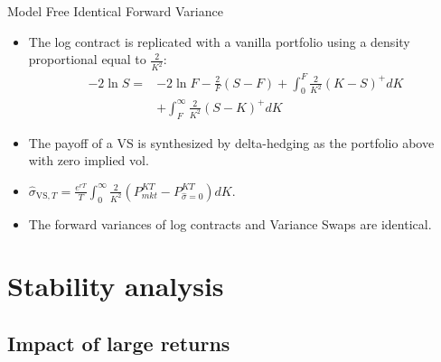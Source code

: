 \documentclass{beamer}
\begin{document}
    \begin{frame}{Model Free Identical Forward Variance}
        \begin{itemize}
            \item The log contract is replicated with a vanilla portfolio using a density proportional equal to \(\frac{2}{K^{2}}\):
            \begin{align*}
                -2 \ln S = & -2\ln F - \frac{2}{F}(S-F) + \int_{0}^{F} \frac{2}{K^{2}}(K-S)^{+}dK\\
                & + \int_{F}^{\infty} \frac{2}{K^{2}}(S-K)^{+}dK
            \end{align*}
            \item The payoff of a VS is synthesized by delta-hedging as the portfolio above with zero implied vol.
            \item $\widehat{\sigma}_{\text{VS},T} = \frac{e^{rT}}{T} \int_{0}^{\infty} \frac{2}{K^{2}}(P^{KT}_{mkt} - P^{KT}_{\hat{\sigma}=0})dK.$
            \item The forward variances of log contracts and Variance Swaps are identical.
        \end{itemize}
    \end{frame}
    
\section{Stability analysis}
    \subsection{Impact of large returns}
    
\end{document}
